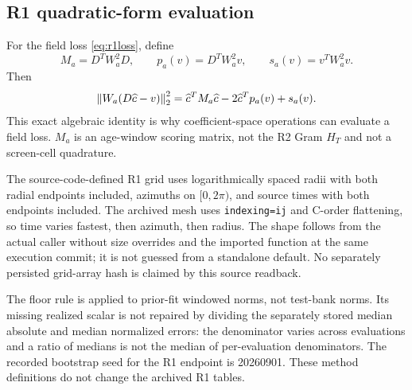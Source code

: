 \subsection{R1 quadratic-form evaluation}
For the field loss \eqref{eq:r1loss}, define
\begin{equation}
M_a=D^TW_a^2D,\qquad p_a(v)=D^TW_a^2v,\qquad s_a(v)=v^TW_a^2v.
\end{equation}
Then
\begin{equation}
\left\lVert W_a(D\widehat c-v)\right\rVert_2^2
=\widehat c^TM_a\widehat c-2\widehat c^Tp_a(v)+s_a(v).
\label{eq:quadraticloss}
\end{equation}
This exact algebraic identity is why coefficient-space operations can evaluate a field loss. $M_a$ is an age-window scoring matrix, not the R2 Gram $H_T$ and not a screen-cell quadrature.

The source-code-defined R1 grid uses logarithmically spaced radii with both radial endpoints included, azimuths on $[0,2\pi)$, and source times with both endpoints included. The archived mesh uses \texttt{indexing=ij} and C-order flattening, so time varies fastest, then azimuth, then radius. The shape follows from the actual caller without size overrides and the imported function at the same execution commit; it is not guessed from a standalone default. No separately persisted grid-array hash is claimed by this source readback.

The floor rule is applied to prior-fit windowed norms, not test-bank norms. Its missing realized scalar is not repaired by dividing the separately stored median absolute and median normalized errors: the denominator varies across evaluations and a ratio of medians is not the median of per-evaluation denominators. The recorded bootstrap seed for the R1 endpoint is 20260901. These method definitions do not change the archived R1 tables.

